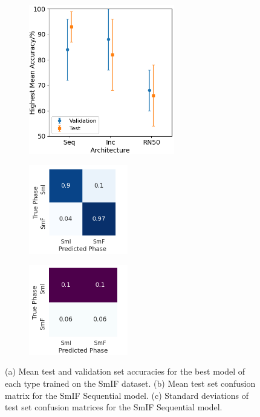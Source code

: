 \documentclass[12pt]{article}
\begin{document}
\begin{figure}[!h]
\centering
\begin{subfigure}{0.4\textwidth}
	\centering
	\includegraphics[width=2.5in]{images/Graphs/SmIF.png}
	\caption{}
	\label{smif:graph}
\end{subfigure}%
\begin{subfigure}{0.25\textwidth}
	\centering
	\includegraphics[width=1.7in]{images/ConMats/SmIF_mean.png}
	\caption{}
	\label{smif:mean}
\end{subfigure}%
\begin{subfigure}{0.25\textwidth}
	\centering
	\includegraphics[width=1.7in]{images/ConMats/SmIF_std.png}
	\caption{}
	\label{smif:std}
\end{subfigure}%
\caption{(a) Mean test and validation set accuracies for the best model of each type trained on the SmIF dataset. (b) Mean test set confusion matrix for the SmIF Sequential model. (c) Standard deviations of test set confusion matrices for the SmIF Sequential model.}
\label{smif:smif}
\end{figure}
\end{document}
